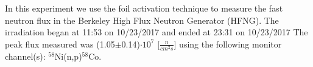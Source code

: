 In this experiment we use the foil activation technique to measure the fast neutron flux in the Berkeley High Flux Neutron Generator (HFNG).  The irradiation began at 11:53 on 10/23/2017 and ended at 23:31 on 10/23/2017  The peak flux measured was (1.05$\pm$0.14)$\cdot 10^7$ [$\frac{n}{cm^2s}$] using the following monitor channel(s): $^{58}$Ni(n,p)$^{58}$Co.